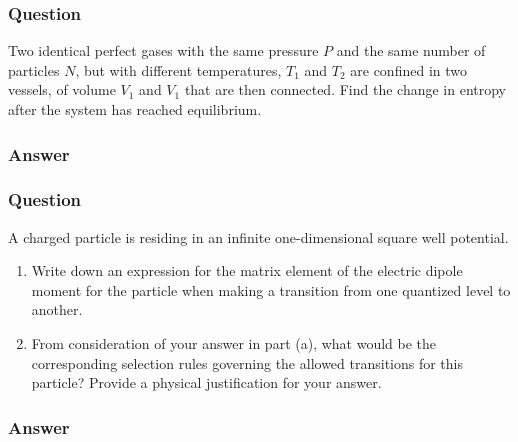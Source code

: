 \subsubsection{Question}
Two identical perfect gases with the same pressure $P$ and the same number of particles $N$, but with different temperatures, $T_1$ and $T_2$ are confined in two vessels, of volume $V_1$ and $V_1$ that are then connected. Find the change in entropy after the system has reached equilibrium.
\subsubsection{Answer}



\subsubsection{Question}
A charged particle is residing in an infinite one-dimensional square well potential.
\begin{enumerate}
	\item Write down an expression for the matrix element of the electric dipole moment for the particle when making a transition from one quantized level to another.
	\item From consideration of your answer in part (a), what would be the corresponding selection rules governing the allowed transitions for this particle? Provide a physical justification for your answer.
\end{enumerate} 
\subsubsection{Answer}



